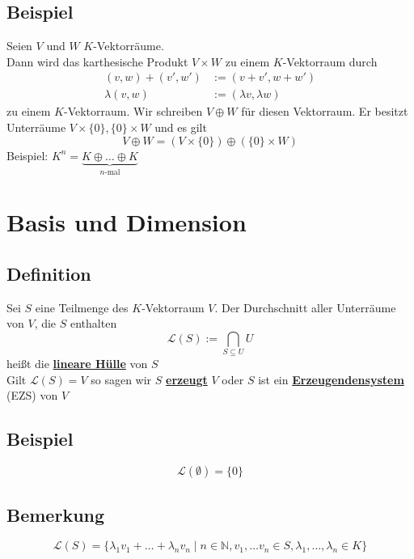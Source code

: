 \subsection{Beispiel} %
\label{sub:beispiel}
Seien $V$ und $W$ $K$-Vektorräume. \\
Dann wird das karthesische Produkt $V \times W$ zu einem $K$-Vektorraum durch 
\begin{align*}
	(v,w) + (v',w') &:= (v + v' , w+ w') \\
	\lambda (v,w) &:= (\lambda v , \lambda  w)
\end{align*}
zu einem $K$-Vektorraum. Wir schreiben $V \oplus W$ für diesen Vektorraum. Er besitzt Unterräume $V \times \{0\} , \{0\} \times W$ und es gilt 
\[
	V \oplus W = (V \times \{0\}) \oplus (\{0\} \times W) 
\]
Beispiel: $K^n = \underbrace{K \oplus \ldots \oplus K}_{\text{$n$-mal}}$

\section{Basis und Dimension} %
\label{sec:basis_und_dimension}

\subsection{Definition} %
\label{sub:definition}
Sei $S$ eine Teilmenge des $K$-Vektorraum $V$. Der Durchschnitt aller Unterräume von $V$, die $S$ enthalten
\[
	\mathcal{L}(S) := \bigcap_{S \subseteq U} U
\]
heißt die \underline{\textbf{lineare Hülle}} von $S$ 
\vspace{\baselineskip} \\
Gilt $\mathcal{L}(S) = V$ so sagen wir $S$ \underline{\textbf{erzeugt}} $V$ oder $S$ ist ein \underline{\textbf{Erzeugendensystem}} (EZS) von $V$

\subsection{Beispiel} %
\label{sub:beispiel}
\[
	\mathcal{L}(\emptyset) = \{ 0 \}
\]

\subsection{Bemerkung} %
\label{sub:bemerkung}
\[
	\mathcal{L} (S) = \{ \lambda_1 v_1  + \ldots  + \lambda_n v_n \mid n \in \mathds{N} , v_1, \ldots  v_n \in S , \lambda_1, \ldots , \lambda_n \in K\}
\]

